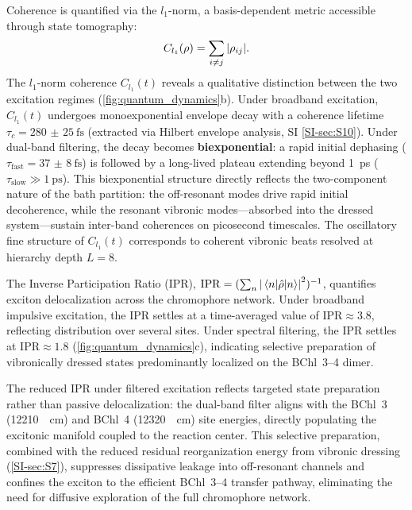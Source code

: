 \documentclass[journal=jpcl,manuscript=letter]{achemso}
\begin{document}
Coherence is quantified via the $l_1$-norm,\cite{Baumgratz2014} a basis-dependent metric accessible through state tomography:
\begin{equation}
C_{l_1}(\rho) = \sum_{i \neq j} \abs{\rho_{ij}}.
\label{eq:l1_coherence}
\end{equation}
The $l_1$-norm coherence $C_{l_1}(t)$ reveals a qualitative distinction between the two excitation regimes (\cref{fig:quantum_dynamics}b). Under broadband excitation, $C_{l_1}(t)$ undergoes monoexponential envelope decay with a coherence lifetime $\tau_c = \SI{280(25)}{\femto\second}$ (extracted via Hilbert envelope analysis, SI \cref{SI-sec:S10}). Under dual-band filtering, the decay becomes \textbf{biexponential}: a rapid initial dephasing ($\tau_{\mathrm{fast}} = \SI{37(8)}{\femto\second}$) is followed by a long-lived plateau extending beyond \SI{1}{\pico\second} ($\tau_{\mathrm{slow}} \gg \SI{1}{\pico\second}$). This biexponential structure directly reflects the two-component nature of the bath partition: the off-resonant modes drive rapid initial decoherence, while the resonant vibronic modes---absorbed into the dressed system---sustain inter-band coherences on picosecond timescales. The oscillatory fine structure of $C_{l_1}(t)$ corresponds to coherent vibronic beats resolved at hierarchy depth $L=8$.

The Inverse Participation Ratio (IPR), $\mathrm{IPR} = (\sum_n \abs{\mel{n}{\hat{\rho}}{n}}^2)^{-1}$, quantifies exciton delocalization across the chromophore network. Under broadband impulsive excitation, the IPR settles at a time-averaged value of $\mathrm{IPR} \approx \num{3.8}$, reflecting distribution over several sites. Under spectral filtering, the IPR settles at $\mathrm{IPR} \approx \num{1.8}$ (\cref{fig:quantum_dynamics}c), indicating selective preparation of vibronically dressed states predominantly localized on the BChl~3--4 dimer. 

The reduced IPR under filtered excitation reflects targeted state preparation rather than passive delocalization: the dual-band filter aligns with the BChl~3 (\SI{12210}{\per\centi\meter}) and BChl~4 (\SI{12320}{\per\centi\meter}) site energies, directly populating the excitonic manifold coupled to the reaction center. This selective preparation, combined with the reduced residual reorganization energy from vibronic dressing (\cref{SI-sec:S7}), suppresses dissipative leakage into off-resonant channels and confines the exciton to the efficient BChl~3--4 transfer pathway, eliminating the need for diffusive exploration of the full chromophore network.
\end{document}
